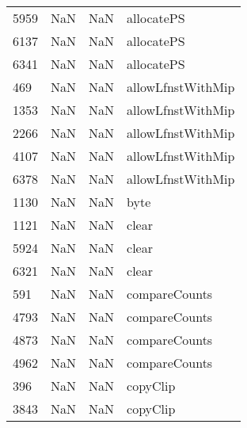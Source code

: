 \begin{tabular}{llll}
5959 &                   NaN &                        NaN &                                allocatePS \\
6137 &                   NaN &                        NaN &                                allocatePS \\
6341 &                   NaN &                        NaN &                                allocatePS \\
469  &                   NaN &                        NaN &                         allowLfnstWithMip \\
1353 &                   NaN &                        NaN &                         allowLfnstWithMip \\
2266 &                   NaN &                        NaN &                         allowLfnstWithMip \\
4107 &                   NaN &                        NaN &                         allowLfnstWithMip \\
6378 &                   NaN &                        NaN &                         allowLfnstWithMip \\
1130 &                   NaN &                        NaN &                                      byte \\
1121 &                   NaN &                        NaN &                                     clear \\
5924 &                   NaN &                        NaN &                                     clear \\
6321 &                   NaN &                        NaN &                                     clear \\
591  &                   NaN &                        NaN &                             compareCounts \\
4793 &                   NaN &                        NaN &                             compareCounts \\
4873 &                   NaN &                        NaN &                             compareCounts \\
4962 &                   NaN &                        NaN &                             compareCounts \\
396  &                   NaN &                        NaN &                                  copyClip \\
3843 &                   NaN &                        NaN &                                  copyClip \\

\end{tabular}
